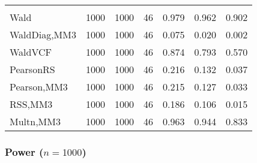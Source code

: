 \documentclass[
]{article}
\begin{document}
\begin{table}[H]
{\begin{tabular}[t]{lrrrrrr}
\addlinespace[0.3em]
\multicolumn{7}{l}{\textbf{3F 15V}}\\
\hspace{1em}Wald & 1000 & 1000 & 46 & 0.979 & 0.962 & 0.902\\
\hspace{1em}WaldDiag,MM3 & 1000 & 1000 & 46 & 0.075 & 0.020 & 0.002\\
\hspace{1em}WaldVCF & 1000 & 1000 & 46 & 0.874 & 0.793 & 0.570\\
\hspace{1em}PearsonRS & 1000 & 1000 & 46 & 0.216 & 0.132 & 0.037\\
\hspace{1em}Pearson,MM3 & 1000 & 1000 & 46 & 0.215 & 0.127 & 0.033\\
\hspace{1em}RSS,MM3 & 1000 & 1000 & 46 & 0.186 & 0.106 & 0.015\\
\hspace{1em}Multn,MM3 & 1000 & 1000 & 46 & 0.963 & 0.944 & 0.833\\
\bottomrule
\end{tabular}}
\endgroup{}
\end{table}

\hypertarget{power-n1000-1}{%
\subsubsection{\texorpdfstring{Power
(\(n=1000\))}{Power (n=1000)}}\label{power-n1000-1}}
\end{document}
